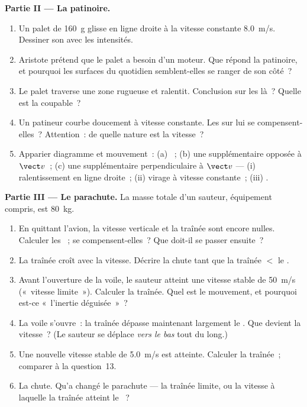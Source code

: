 \begin{problem}
\medskip
\noindent\textbf{Partie II --- La patinoire.}
\begin{enumerate}[resume]
  \item Un palet de \qty{160}{g} glisse en ligne droite à la vitesse
        constante \qty{8.0}{m/s}. Dessiner son
         avec les intensités.
  \item Aristote prétend que le palet a besoin d'un moteur. Que répond
        la patinoire, et pourquoi les surfaces du quotidien semblent-elles
        se ranger de son côté~?
  \item Le palet traverse une zone rugueuse et ralentit. Conclusion sur
        les  là~? Quelle  est la
        coupable~?
  \item Un patineur courbe doucement à vitesse constante. Les
         sur lui se compensent-elles~?
        Attention~: de quelle nature est la vitesse~?
  \item Apparier diagramme et mouvement~: (a) ~; (b) une  supplémentaire opposée à
        $\vect v$~; (c) une  supplémentaire perpendiculaire
        à $\vect v$ --- (i) ralentissement en ligne droite~; (ii) virage
        à vitesse constante~; (iii) .
\end{enumerate}

\medskip
\noindent\textbf{Partie III --- Le parachute.}
La masse totale d'un sauteur, équipement compris, est \qty{80}{kg}.
\begin{enumerate}[resume]
  \item En quittant l'avion, la vitesse verticale et la traînée sont
        encore nulles. Calculer les ~; se
        compensent-elles~? Que doit-il se passer ensuite~?
  \item La traînée croît avec la vitesse. Décrire la chute tant que la
        traînée $<$ le .
  \item Avant l'ouverture de la voile, le sauteur atteint une vitesse
        stable de \qty{50}{m/s} («~vitesse limite~»). Calculer la
        traînée. Quel est le mouvement, et pourquoi est-ce «~l'inertie
        déguisée~»~?
  \item La voile s'ouvre~: la traînée dépasse maintenant largement le
        . Que devient la vitesse~? (Le sauteur se
        déplace \emph{vers le bas} tout du long.)
  \item Une nouvelle vitesse stable de \qty{5.0}{m/s} est atteinte.
        Calculer la traînée~; comparer à la question~13.
  \item La chute. Qu'a changé le parachute --- la traînée limite, ou la
        vitesse à laquelle la traînée atteint le
        ~?
\end{enumerate}


\end{problem}
